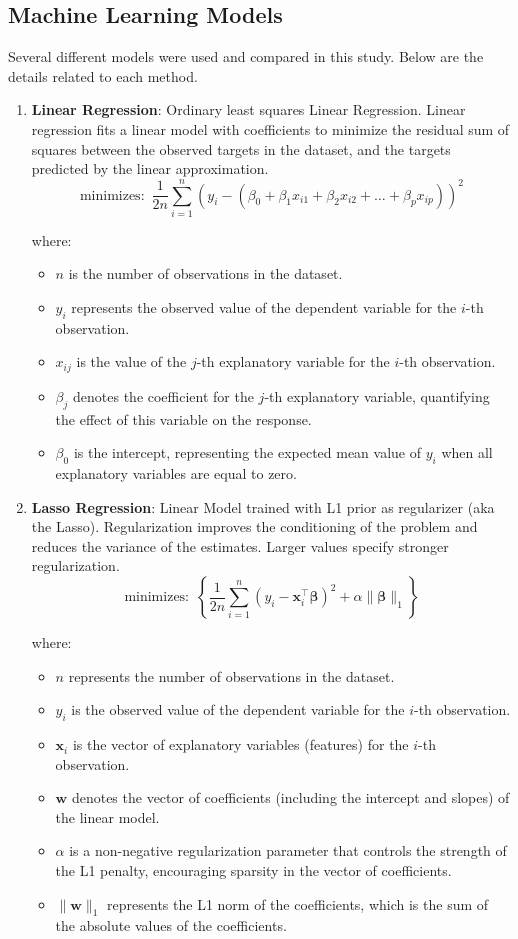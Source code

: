 \documentclass{article}
\theoremstyle{mytheoremstyle}
\theoremstyle{mytheoremstyle}
\theoremstyle{myproblemstyle}
\begin{document}
\subsection{Machine Learning Models}
Several different models were used and compared in this study. Below are the details related to each method. 
\begin{enumerate}
    \item \textbf{Linear Regression}: Ordinary least squares Linear Regression. Linear regression fits a linear model with coefficients to minimize the residual sum of squares between the observed targets in the dataset, and the targets predicted by the linear approximation.
    \[
        \text{minimizes: } \, \frac{1}{2n} \sum_{i=1}^n \left(y_i - (\beta_0 + \beta_1 x_{i1} + \beta_2 x_{i2} + \dots + \beta_p x_{ip})\right)^2\]

where:
\begin{itemize}
    \item $n$ is the number of observations in the dataset.
    \item $y_i$ represents the observed value of the dependent variable for the $i$-th observation.
    \item $x_{ij}$ is the value of the $j$-th explanatory variable for the $i$-th observation.
    \item $\beta_j$ denotes the coefficient for the $j$-th explanatory variable, quantifying the effect of this variable on the response.
    \item $\beta_0$ is the intercept, representing the expected mean value of $y_i$ when all explanatory variables are equal to zero.
\end{itemize}


    \item \textbf{Lasso Regression}: Linear Model trained with L1 prior as regularizer (aka the Lasso). Regularization improves the conditioning of the problem and reduces the variance of the estimates. Larger values specify stronger regularization.
    \[
\text{minimizes: } \, \left\{ \frac{1}{2n} \sum_{i=1}^n (y_i - \mathbf{x}_i^\top \mathbf{\beta})^2 + \alpha \|\mathbf{\beta}\|_1 \right\}
\]

where:
\begin{itemize}
    \item $n$ represents the number of observations in the dataset.
    \item $y_i$ is the observed value of the dependent variable for the $i$-th observation.
    \item $\mathbf{x}_i$ is the vector of explanatory variables (features) for the $i$-th observation.
    \item $\mathbf{w}$ denotes the vector of coefficients (including the intercept and slopes) of the linear model.
    \item $\alpha$ is a non-negative regularization parameter that controls the strength of the L1 penalty, encouraging sparsity in the vector of coefficients.
    \item $\|\mathbf{w}\|_1$ represents the L1 norm of the coefficients, which is the sum of the absolute values of the coefficients.
\end{itemize}


\end{enumerate}
\end{document}
